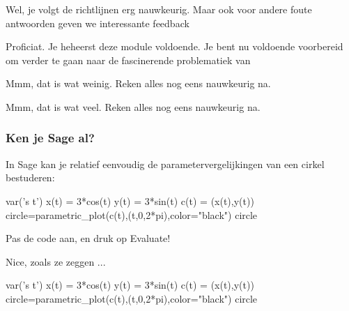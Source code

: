 \documentclass[handout]{ximera}
\begin{document}
\begin{problem}
\begin{question}
 
      
          \begin{feedback}[y==7]
            Wel, je volgt de richtlijnen erg nauwkeurig. Maar ook voor andere foute antwoorden geven we interessante feedback
          \end{feedback}
          \begin{feedback}[y==8]
          Proficiat. Je heheerst deze module voldoende. Je bent nu voldoende voorbereid om verder te gaan naar de fascinerende problematiek van 
          \end{feedback}
          \begin{feedback}[y<7]
              Mmm, dat is wat weinig. Reken alles nog eens nauwkeurig na.
            \end{feedback}
          \begin{feedback}[y>8]
               Mmm, dat is wat veel. Reken alles nog eens nauwkeurig na.
           \end{feedback}
       \end{question}
\end{problem}

\subsubsection{Ken je Sage al?}

In Sage kan je relatief eenvoudig de parametervergelijkingen van een cirkel bestuderen:

\begin{sageCell}
    var('s t')
    x(t) = 3*cos(t)
    y(t) = 3*sin(t)
    c(t) = (x(t),y(t))
    circle=parametric_plot(c(t),(t,0,2*pi),color="black")
    circle
\end{sageCell}


\begin{onlineOnly}
    
    Pas de code aan, en druk op Evaluate!
    
    Nice, zoals ze zeggen ...
    
\begin{sageOutput}
    var('s t')
    x(t) = 3*cos(t)
    y(t) = 3*sin(t)
    c(t) = (x(t),y(t))
    circle=parametric_plot(c(t),(t,0,2*pi),color="black")
    circle
\end{sageOutput}
\end{onlineOnly}
\end{document}
